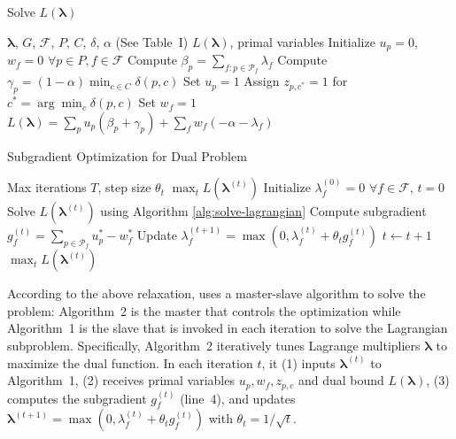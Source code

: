 \begin{algorithm}[t]
\caption{Solve \( L(\boldsymbol{\lambda}) \)}
\label{alg:solve-lagrangian}
\begin{algorithmic}[1]
\footnotesize
\Require \(\boldsymbol{\lambda}\), \(G\), \(\mathcal{F}\), \(P\), \(C\), \(\delta\), \(\alpha\) (See Table~I)
\Ensure \(L(\boldsymbol{\lambda})\), primal variables
\State Initialize \(u_p = 0\), \(w_f = 0\) \(\forall p \in P, f \in \mathcal{F}\)
  \State Compute \(\beta_p = \sum_{f: p \in \mathcal{P}_f} \lambda_f\) 
  \State Compute \(\gamma_p = (1-\alpha) \min_{c \in C} \delta(p, c)\) 
   
    \State Set \(u_p = 1\)
    \State Assign \(z_{p,c^*} = 1\) for \(c^* = \arg\min_c \delta(p,c)\)
  \EndIf
\EndFor
{}
   
    \State Set \(w_f = 1\) 
  \EndIf
\EndFor
\State \Return \(L(\boldsymbol{\lambda}) = \sum_p u_p (\beta_p + \gamma_p) + \sum_f w_f (-\alpha - \lambda_f)\)
\end{algorithmic}
\end{algorithm}

\begin{algorithm}[t]
\caption{Subgradient Optimization for Dual Problem}
\label{alg:subgradient}
\begin{algorithmic}[1]
\footnotesize
\Require Max iterations \(T\), step size \(\theta_t\)
\Ensure \(\max_t L(\boldsymbol{\lambda}^{(t)})\)
\State Initialize \(\lambda_f^{(0)} = 0\) \(\forall f \in \mathcal{F}\), \(t = 0\)
  \State Solve \(L(\boldsymbol{\lambda}^{(t)})\) using Algorithm \ref{alg:solve-lagrangian}
  \State Compute subgradient \(g_f^{(t)} = \sum_{p \in \mathcal{P}_f} u_p^* - w_f^*\)
  \State Update \(\lambda_f^{(t+1)} = \max\left(0, \lambda_f^{(t)} + \theta_t g_f^{(t)}\right)\)
  \State \(t \leftarrow t + 1\)
\EndWhile
\State \Return \(\max_t L(\boldsymbol{\lambda}^{(t)})\)
\end{algorithmic}
\end{algorithm}

According to the above relaxation, \sysname uses a master-slave algorithm to solve the problem: Algorithm~2 is the master that controls the optimization while Algorithm~1 is the slave that is invoked in each iteration to solve the Lagrangian subproblem. Specifically, Algorithm~2 iteratively tunes Lagrange multipliers $\boldsymbol{\lambda}$ to maximize the dual function. In each iteration $t$, it (1) inputs $\boldsymbol{\lambda}^{(t)}$ to Algorithm~1, (2) receives primal variables $u_p, w_f, z_{p,c}$ and dual bound $L(\boldsymbol{\lambda})$, (3) computes the subgradient $g_f^{(t)}$ (line~4), and updates $\boldsymbol{\lambda}^{(t+1)} = \max(0, \lambda_f^{(t)} + \theta_t g_f^{(t)})$ with $\theta_t = 1/\sqrt{t}$. 

